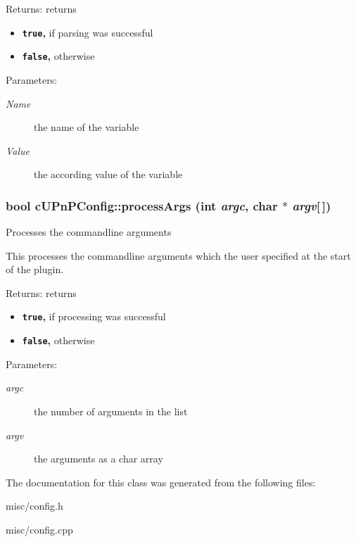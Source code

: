 \begin{Desc}
\item[Returns:]returns\begin{itemize}
\item {\bf {\tt true},} if parsing was successful\item {\bf {\tt false},} otherwise \end{itemize}
\end{Desc}
\begin{Desc}
\item[Parameters:]
\begin{description}
\item[{\em Name}]the name of the variable \item[{\em Value}]the according value of the variable \end{description}
\end{Desc}
\hypertarget{classcUPnPConfig_19689798911a39c47958e819c33d4b09}{
\subsubsection[{processArgs}]{\setlength{\rightskip}{0pt plus 5cm}bool cUPnPConfig::processArgs (int {\em argc}, \/  char $\ast$ {\em argv}\mbox{[}$\,$\mbox{]})}}
\label{classcUPnPConfig_19689798911a39c47958e819c33d4b09}


Processes the commandline arguments

This processes the commandline arguments which the user specified at the start of the plugin.

\begin{Desc}
\item[Returns:]returns\begin{itemize}
\item {\bf {\tt true},} if processing was successful\item {\bf {\tt false},} otherwise \end{itemize}
\end{Desc}
\begin{Desc}
\item[Parameters:]
\begin{description}
\item[{\em argc}]the number of arguments in the list \item[{\em argv}]the arguments as a char array \end{description}
\end{Desc}


The documentation for this class was generated from the following files:\begin{CompactItemize}
\item 
misc/config.h\item 
misc/config.cpp\end{CompactItemize}
